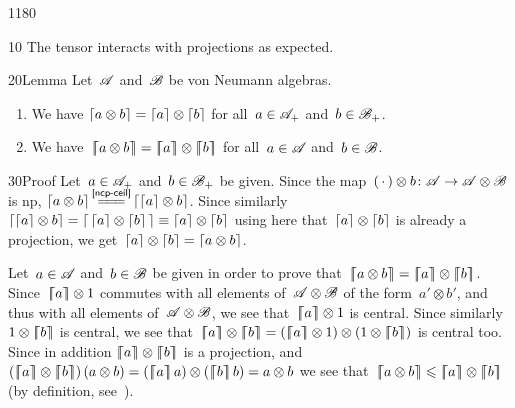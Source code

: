 \begin{parsec}{1180}%
\begin{point}{10}%
The tensor interacts
with projections as expected.
\end{point}
\begin{point}{20}{Lemma}%
Let~$\mathscr{A}$ and~$\mathscr{B}$ be von Neumann algebras.
\begin{enumerate}
\item
We have $\left\lceil a\otimes b\right\rceil = \left\lceil a\right\rceil\otimes \left\lceil b\right\rceil$
for all~$a\in\mathscr{A}_+$ and~$b\in\mathscr{B}_+$.
\item
We have~$\cceil{a\otimes b} = \cceil{a}\otimes \cceil{b}$
for all~$a\in\mathscr{A}$ and~$b\in\mathscr{B}$.
\end{enumerate}
\spacingfix%
\begin{point}{30}{Proof}%
Let~$a\in\mathscr{A}_+$ and~$b\in\mathscr{B}_+$ be given.
Since the map~$(\,\cdot\,)\otimes b\colon \mathscr{A}\to \mathscr{A}\otimes \mathscr{B}$
is np,
$\ceil{a\otimes b}
\smash{\overset{\sref{ncp-ceil}}{=\joinrel=\joinrel=}}
\ceil{\ceil{a}\otimes b}$.
Since similarly~$\left\lceil\left\lceil a\right\rceil\otimes b\right\rceil
=\left\lceil\,\left\lceil a\right\rceil\otimes \left\lceil b\right\rceil\,\right\rceil
\equiv \left\lceil a\right\rceil\otimes\left\lceil b\right\rceil$
using here that~$\left\lceil a\right\rceil\otimes\left\lceil b\right\rceil$
is already a projection,
we get~$\left\lceil a\right\rceil\otimes \left\lceil b\right\rceil=\left\lceil a\otimes b\right\rceil$.

Let~$a\in\mathscr{A}$ and~$b\in\mathscr{B}$ be given
in order to prove that~$\cceil{a\otimes b}
=\cceil{a}\otimes\cceil{b}$.
Since~$\left\lceil\!\!\left\lceil a\right\rceil\!\!\right\rceil\otimes 1$ 
commutes with all elements of~$\mathscr{A}\otimes \mathscr{B}$
of the form~$a'\otimes b'$,
and thus with all elements of~$\mathscr{A}\otimes \mathscr{B}$,
we see that~$\left\lceil\!\!\left\lceil a\right\rceil\!\!\right\rceil\otimes 1$ is central.
Since similarly $1\otimes\left\lceil\!\!\left\lceil b\right\rceil\!\!\right\rceil$ is central,
we see that~$\cceil{a}\otimes \cceil{b}
= (\cceil{a}\otimes 1)\otimes(1\otimes \cceil{b})$
is central too.
Since
in addition 
$\cceil{a}\otimes\cceil{b}$
is a projection,
and $(\cceil{a}\otimes\cceil{b})\,(a\otimes b)
= (\cceil{a}a)\otimes (\cceil{b}b)
= a\otimes b$
we see that~$\cceil{a\otimes b}\leq \cceil{a}\otimes \cceil{b}$
(by definition, see~).


\end{point}
\end{point}
\end{parsec}

